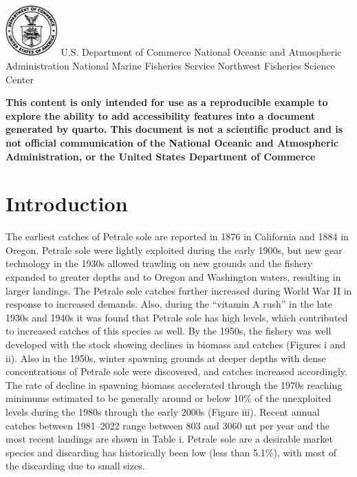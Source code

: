 \documentclass[
]{scrartcl}
\renewcommand*\contentsname{Table of contents}
\newcommand\contentsname{Table of contents}
\begin{document}
\begin{titlepage}
\begin{minipage}[b][\textheight][s]{\textwidth}
  \includegraphics[width=2cm]{partials/us_doc_logo.png}\newline
  U.S. Department of Commerce\newline
  National Oceanic and Atmospheric Administration\newline
  National Marine Fisheries Service\newline
  Northwest Fisheries Science Center\newline

  \end{minipage}
  \restoregeometry
  \end{titlepage}

\renewcommand*\contentsname{Table of contents}
{
\hypersetup{linkcolor=}
\setcounter{tocdepth}{3}
\tableofcontents
}
\listoffigures
\listoftables

\newpage{}

\textbf{This content is only intended for use as a reproducible example
to explore the ability to add accessibility features into a document
generated by quarto. This document is not a scientific product and is
not official communication of the National Oceanic and Atmospheric
Administration, or the United States Department of Commerce}

\newpage{}

\section{Introduction}\label{sec-intro}

The earliest catches of Petrale sole are reported in 1876 in California
and 1884 in Oregon. Petrale sole were lightly exploited during the early
1900s, but new gear technology in the 1930s allowed trawling on new
grounds and the fishery expanded to greater depths and to Oregon and
Washington waters, resulting in larger landings. The Petrale sole
catches further increased during World War II in response to increased
demands. Also, during the ``vitamin A rush'' in the late 1930s and 1940s
it was found that Petrale sole has high levels, which contributed to
increased catches of this species as well. By the 1950s, the fishery was
well developed with the stock showing declines in biomass and catches
(Figures i and ii). Also in the 1950s, winter spawning grounds at deeper
depths with dense concentrations of Petrale sole were discovered, and
catches increased accordingly. The rate of decline in spawning biomass
accelerated through the 1970s reaching minimums estimated to be
generally around or below 10\% of the unexploited levels during the
1980s through the early 2000s (Figure iii). Recent annual catches
between 1981--2022 range between 803 and 3060 mt per year and the most
recent landings are shown in Table i. Petrale sole are a desirable
market species and discarding has historically been low (less than
5.1\%), with most of the discarding due to small sizes.
\end{document}
